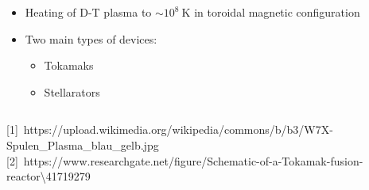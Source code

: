 \documentclass{beamer}
\begin{document}
\begin{frame}
\begin{columns}[onlytextwidth]
\begin{column}{0.55\textwidth}
\begin{center}
\begin{itemize}
				\item Heating of D-T plasma to $\sim10^8~\text{K}$ in toroidal magnetic configuration
				\vspace{0.5cm}
				\item Two main types of devices: 
				\begin{itemize}
				\item Tokamaks 
				\item Stellarators
				\end{itemize}
			\end{itemize}
		\end{center}
	\end{column}
\end{columns}
	\begin{footnotesize}
	{\tiny [1]~https://upload.wikimedia.org/wikipedia/commons/b/b3/W7X-Spulen\_Plasma\_blau\_gelb.jpg\hfill
\vspace{-0.2cm} [2]~https://www.researchgate.net/figure/Schematic-of-a-Tokamak-fusion-reactor\textbackslash41719279}
\end{footnotesize}
 \end{frame}
\end{document}
